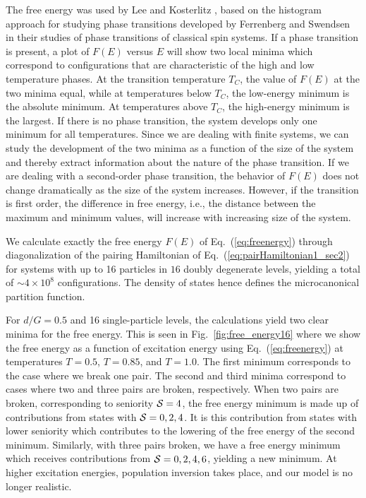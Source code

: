 \documentclass[rmp,preprint,aps,floatfix]{revtex4}
\begin{document}
The free energy was used by
Lee and Kosterlitz \cite{lk90,lk91},
based on the histogram approach for studying
phase transitions developed by Ferrenberg and Swendsen \cite{fs88,fs89}
in their studies of phase transitions
of classical spin systems.
If a phase transition is present, a plot of $F(E)$ versus $E$ will show
two local minima which correspond to configurations that are
characteristic of the high and low temperature phases.
At the transition temperature $T_C$, the value of $F(E)$ at the
two minima equal, while at temperatures below $T_C$, the low-energy
minimum is the absolute minimum. At temperatures above $T_C$, the high-energy
minimum is the largest. If there is no
phase transition, the system develops only one minimum for all temperatures.
Since we are dealing with finite systems, we can study the development
of the two minima as a function of the size of the system and thereby
extract information about the nature of the phase transition. If we are dealing
with a second-order phase transition, the behavior of $F(E)$ does not change
dramatically as the size of the system increases. However, if the transition
is first order, the difference in free energy, i.e.,
the distance between the maximum and minimum values,
will increase with increasing size of the system.


We calculate exactly the  
free energy $F(E)$ of Eq.~(\ref{eq:freenergy})
through diagonalization of the pairing Hamiltonian of 
Eq.~(\ref{eq:pairHamiltonian1_sec2})
for systems with up to 16 particles in $16$ doubly degenerate
levels, yielding a total of $\sim 4\times 10^8$ configurations. The
density of states hence defines the microcanonical partition function.


For $d/G=0.5$ and 16 single-particle levels, the calculations yield
two clear  minima for the free energy.
This is seen in
Fig.~\ref{fig:free_energy16} where we show the free energy as a function of 
excitation energy
using Eq.~(\ref{eq:freenergy}) at temperatures $T=0.5$, $T=0.85$, and $T=1.0$.
The first minimum corresponds to the case where we break one pair.
The second and third minima  correspond
to cases where two and three pairs are broken, respectively. 
When two pairs are broken, corresponding to seniority ${\cal S}=4$, 
the free energy minimum is made up of contributions
from states with ${\cal S}=0,2,4$. It is this contribution from states 
with lower seniority which contributes to the lowering of the free
energy of the second minimum. Similarly, with three pairs
broken, we have a free energy minimum which receives contributions
from ${\cal S}=0,2,4,6$, yielding a new minimum. 
At higher excitation energies, population
inversion takes place, and our model is no longer realistic. 
\end{document}
